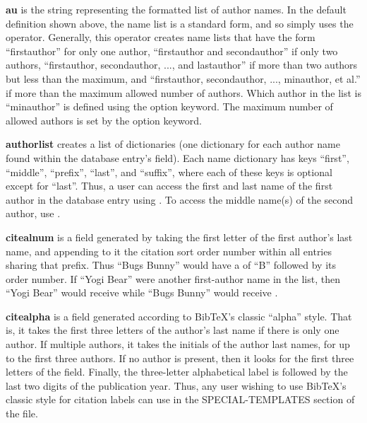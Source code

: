 \documentclass[letterpaper,10pt,english]{sphinxmanual}
\begin{document}
\textbf{au} is the string representing the formatted list of author names. In the default definition shown above, the name list is a standard form, and so simply uses the  operator. Generally, this operator creates name lists that have the form ``firstauthor'' for only one author, ``firstauthor and secondauthor'' if only two authors, ``firstauthor, secondauthor, ..., and lastauthor'' if more than two authors but less than the maximum, and ``firstauthor, secondauthor, ..., minauthor, et al.'' if more than the maximum allowed number of authors. Which author in the list is ``minauthor'' is defined using the  option keyword. The maximum number of allowed authors is set by the  option keyword.

\textbf{authorlist} creates a list of dictionaries (one dictionary for each author name found within the database entry's  field). Each name dictionary has keys ``first'', ``middle'', ``prefix'', ``last'', and ``suffix'', where each of these keys is optional except for ``last''. Thus, a user can access the first and last name of the first author in the database entry using . To access the middle name(s) of the second author, use .

\textbf{citealnum} is a field generated by taking the first letter of the first author's last name, and appending to it the citation sort order number within all entries sharing that prefix. Thus ``Bugs Bunny'' would have a  of ``B'' followed by its order number. If ``Yogi Bear'' were another first-author name in the list, then ``Yogi Bear'' would receive  while ``Bugs Bunny'' would receive .

\textbf{citealpha} is a field generated according to BibTeX's classic ``alpha'' style. That is, it takes the first three letters of the author's last name if there is only one author. If multiple authors, it takes the initials of the author last names, for up to the first three authors. If no author is present, then it looks for the first three letters of the  field. Finally, the three-letter alphabetical label is followed by the last two digits of the publication year. Thus, any user wishing to use BibTeX's classic  style for citation labels can use  in the SPECIAL-TEMPLATES section of the file.
\end{document}
